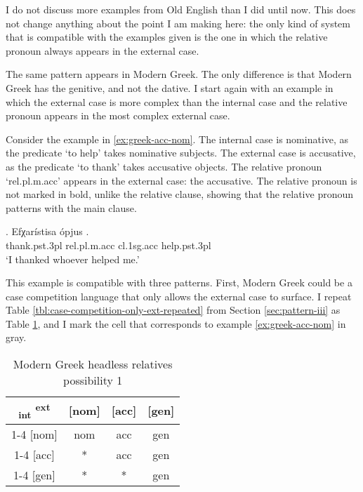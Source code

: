 I do not discuss more examples from Old English than I did until now. This does not change anything about the point I am making here: the only kind of system that is compatible with the examples given is the one in which the relative pronoun always appears in the external case.

The same pattern appears in Modern Greek. The only difference is that Modern Greek has the genitive, and not the dative. I start again with an example in which the external case is more complex than the internal case and the relative pronoun appears in the most complex external case.

Consider the example in \ref{ex:greek-acc-nom}.
The internal case is nominative, as the predicate  `to help' takes nominative subjects.
The external case is accusative, as the predicate  `to thank' takes accusative objects.
The relative pronoun  `\ac{rel}.\ac{pl}.\ac{m}.\ac{acc}' appears in the external case: the accusative. The relative pronoun is not marked in bold, unlike the relative clause, showing that the relative pronoun patterns with the main clause.

\exg. Efχarístisa ópjus  .\\
thank.\ac{pst}.3\ac{pl}\scsub{[acc]} \ac{rel}.\ac{pl}.\ac{m}.\ac{acc} \ac{cl}.1\ac{sg}.\ac{acc} help.\ac{pst}.3\ac{pl}\scsub{[nom]}\\
`I thanked whoever helped me.' \label{ex:greek-acc-nom}

This example is compatible with three patterns. First, Modern Greek could be a case competition language that only allows the external case to surface. I repeat Table \ref{tbl:case-competition-only-ext-repeated} from Section \ref{sec:pattern-iii} as Table \ref{tbl:greek-poss1}, and I mark the cell that corresponds to example \ref{ex:greek-acc-nom} in gray.

 \begin{table}[ht]
   \center
   \caption{Modern Greek headless relatives possibility 1}
   \begin{tabular}{c|c|c|c}
     \toprule
     \textsubscript{\ac{int}} \textsuperscript{\ac{ext}}
            & [\ac{nom}]
            & [\ac{acc}]
            & [\ac{gen}]
            \\ \cmidrule{1-4}
        [\ac{nom}]
            & \ac{nom}
            & \cellcolor{LG}\ac{acc}
            & \ac{gen}
            \\ \cmidrule{1-4}
        [\ac{acc}]
            & *
            & \ac{acc}
            & \ac{gen}
            \\ \cmidrule{1-4}
        [\ac{gen}]
            & *
            & *
            & \ac{gen}
            \\
      \bottomrule
   \end{tabular}
     \label{tbl:greek-poss1}
 \end{table}

